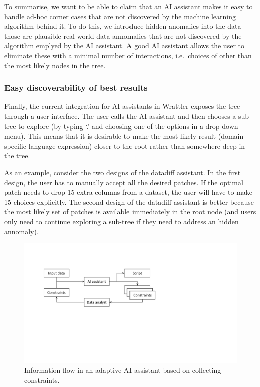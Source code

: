 \documentclass{article}
\begin{document}
To summarise, we want to be able to claim that an AI assistant makes it easy to handle ad-hoc
corner cases that are not discovered by the machine learning algorithm behind it. To do this,
we introduce hidden anomalies into the data -- those are plausible real-world data annomalies 
that are not discovered by the algorithm emplyed by the AI assistant. A good AI assistant allows
the user to eliminate these with a minimal number of interactions, i.e.~choices of other than
the most likely nodes in the tree. 

\subsubsection{Easy discoverability of best results}

Finally, the current integration for AI assistants in Wrattler exposes the tree through a
user interface. The user calls the AI assistant and then chooses a sub-tree to explore 
(by typing `.' and choosing one of the options in a drop-down menu). This means that it is
desirable to make the most likely result (domain-specific language expression) closer to the
root rather than somewhere deep in the tree.

As an example, consider the two designs of the datadiff assistant. In the first design, the
user has to manually accept all the desired patches. If the optimal patch needs to drop 15
extra columns from a dataset, the user will have to make 15 choices explicitly. The
second design of the datadiff assistant is better because the most likely set of patches
is available immediately in the root node (and users only need to continue exploring a
sub-tree if they need to address an hidden annomaly).

\begin{figure}
\includegraphics[scale=0.55,trim=1cm 8.5cm 11cmm 4cm,crop]{diagrams.pdf}
\caption{Information flow in an adaptive AI assistant based on collecting constraints.}
\label{fig:aiflow}
\end{figure}
\end{document}
